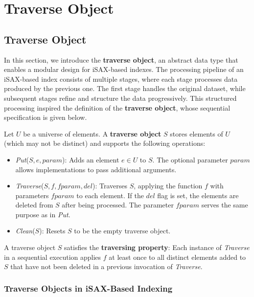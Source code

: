 \chapter{Traverse Object}
\label{chapter:traverse-object}
\vspace{-0.5cm}

\section{Traverse Object}
In this section, we introduce the \textbf{traverse object}, an abstract data type
that enables a modular design for iSAX-based indexes. The processing pipeline of
an iSAX-based index consists of multiple stages, where each stage processes data
produced by the previous one. The first stage handles the original dataset, while
subsequent stages refine and structure the data progressively. This structured
processing inspired the definition of the \textbf{traverse object}, whose
sequential specification is given below.
% 
\begin{definition}
\label{def:traverse}
Let $U$ be a universe of elements. A \textbf{traverse object} $S$ stores elements
of $U$ (which may not be distinct) and supports the following operations:

\begin{itemize}
    \item \textit{Put}($S,e,\mathit{param}$): Adds an element $e \in U$ to $S$.
    The optional parameter $\mathit{param}$ allows implementations to pass
    additional arguments.
    
    \item \textit{Traverse}($S,f,\mathit{fparam},del$): Traverses $S$, applying
    the function $f$ with parameters $\mathit{fparam}$ to each element. If the
    $del$ flag is set, the elements are deleted from $S$ after being processed.
    The parameter $\mathit{fparam}$ serves the same purpose as in \textit{Put}.

    \item \textit{Clean}($S$): Resets $S$ to be the empty traverse
    object.
\end{itemize}
% 
A traverse object $S$ satisfies the \textbf{traversing property}:  
Each instance of \textit{Traverse} in a sequential execution applies $f$ at
least once to all distinct elements added to $S$ that have not been deleted
in a previous invocation of \textit{Traverse}.
\end{definition}

\subsection{Traverse Objects in iSAX-Based Indexing}

